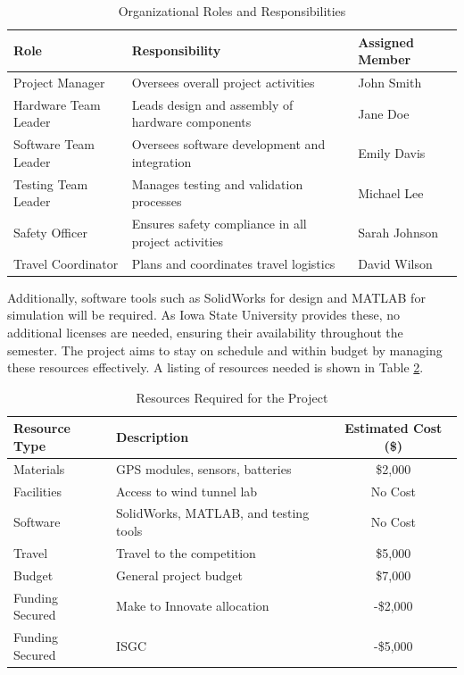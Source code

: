 \begin{table}[ht!]
    \centering
    \begin{tabular}{|l|l|l|}
        \hline
        \textbf{Role} & \textbf{Responsibility} & \textbf{Assigned Member} \\ \hline
        Project Manager & Oversees overall project activities & John Smith \\ \hline
        Hardware Team Leader & Leads design and assembly of hardware components & Jane Doe \\ \hline
        Software Team Leader & Oversees software development and integration & Emily Davis \\ \hline
        Testing Team Leader & Manages testing and validation processes & Michael Lee \\ \hline
        Safety Officer & Ensures safety compliance in all project activities & Sarah Johnson \\ \hline
        Travel Coordinator & Plans and coordinates travel logistics & David Wilson \\ \hline
    \end{tabular}
    \caption{Organizational Roles and Responsibilities}
    \label{tab:orgchart}
\end{table}

Additionally, software tools such as SolidWorks for design and MATLAB for simulation will be required. As Iowa State University provides these, no additional licenses are needed, ensuring their availability throughout the semester. The project aims to stay on schedule and within budget by managing these resources effectively. A listing of resources needed is shown in Table \ref{tab:resources}.

\begin{table}[ht!]
    \centering
    \begin{tabular}{|l|l|c|}
        \hline
        \textbf{Resource Type} & \textbf{Description} & \textbf{Estimated Cost (\$)} \\ \hline
        Materials & GPS modules, sensors, batteries & \$2,000 \\ \hline
        Facilities & Access to wind tunnel lab & No Cost \\ \hline
        Software & SolidWorks, MATLAB, and testing tools & No Cost \\ \hline
        Travel & Travel to the competition & \$5,000 \\ \hline
        Budget & General project budget & \$7,000 \\ \hline
        Funding Secured & Make to Innovate allocation & -\$2,000 \\ \hline
        Funding Secured & ISGC & -\$5,000 \\ \hline
    \end{tabular}
    \caption{Resources Required for the Project}
    \label{tab:resources}
\end{table}

